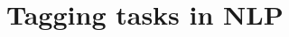 
%


\section{Tagging tasks in NLP}
\frame{\tableofcontents[currentsection]}
\newcommand{\postag}[1]{{\color{red}/#1}}
\newcommand{\nertag}[1]{{\color{blue}/#1}}

